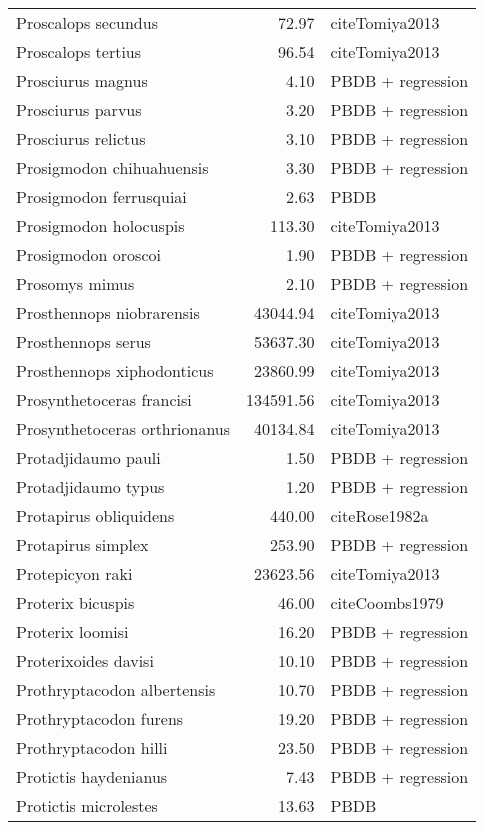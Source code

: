 \begin{table}[ht]
\begin{tabular}{lrl}
  Proscalops secundus & 72.97 & cite{Tomiya2013} \\ 
  Proscalops tertius & 96.54 & cite{Tomiya2013} \\ 
  Prosciurus magnus & 4.10 & PBDB + regression \\ 
  Prosciurus parvus & 3.20 & PBDB + regression \\ 
  Prosciurus relictus & 3.10 & PBDB + regression \\ 
  Prosigmodon chihuahuensis & 3.30 & PBDB + regression \\ 
  Prosigmodon ferrusquiai & 2.63 & PBDB \\ 
  Prosigmodon holocuspis & 113.30 & cite{Tomiya2013} \\ 
  Prosigmodon oroscoi & 1.90 & PBDB + regression \\ 
  Prosomys mimus & 2.10 & PBDB + regression \\ 
  Prosthennops niobrarensis & 43044.94 & cite{Tomiya2013} \\ 
  Prosthennops serus & 53637.30 & cite{Tomiya2013} \\ 
  Prosthennops xiphodonticus & 23860.99 & cite{Tomiya2013} \\ 
  Prosynthetoceras francisi & 134591.56 & cite{Tomiya2013} \\ 
  Prosynthetoceras orthrionanus & 40134.84 & cite{Tomiya2013} \\ 
  Protadjidaumo pauli & 1.50 & PBDB + regression \\ 
  Protadjidaumo typus & 1.20 & PBDB + regression \\ 
  Protapirus obliquidens & 440.00 & cite{Rose1982a} \\ 
  Protapirus simplex & 253.90 & PBDB + regression \\ 
  Protepicyon raki & 23623.56 & cite{Tomiya2013} \\ 
  Proterix bicuspis & 46.00 & cite{Coombs1979} \\ 
  Proterix loomisi & 16.20 & PBDB + regression \\ 
  Proterixoides davisi & 10.10 & PBDB + regression \\ 
  Prothryptacodon albertensis & 10.70 & PBDB + regression \\ 
  Prothryptacodon furens & 19.20 & PBDB + regression \\ 
  Prothryptacodon hilli & 23.50 & PBDB + regression \\ 
  Protictis haydenianus & 7.43 & PBDB + regression \\ 
  Protictis microlestes & 13.63 & PBDB \\ 

\end{tabular}
\end{table}
